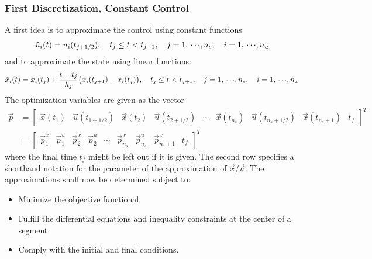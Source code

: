 			\subsubsection{First Discretization, Constant Control} %
				A first idea is to approximate the control using constant functions
				\begin{align*}
					\tilde{u}_i(t) = u_i(t_{j + 1/2}),\quad t_j \leq t < t_{j + 1},\quad j = 1,\,\cdots\!,n_s,\quad i = 1,\,\cdots\!,n_u
				\end{align*}
				and to approximate the state using linear functions:
				\begin{align*}
					\tilde{x}_i(t) = x_i(t_j) + \frac{t - t_j}{h_j} \big( x_i(t_{j + 1}) - x_i(t_j) \big),\quad t_j \leq t < t_{j + 1},\quad j = 1,\,\cdots\!,n_s,\quad i = 1,\,\cdots\!,n_x
				\end{align*}
				The optimization variables are given as the vector
				\begin{align*}
					\vec{p}
						&= \begin{bmatrix} \vec{x}(t_1) & \vec{u}(t_{1 + 1/2}) & \vec{x}(t_2) & \vec{u}(t_{2 + 1/2}) & \cdots & \vec{x}(t_{n_s}) & \vec{u}(t_{n_s + 1/2}) & \vec{x}(t_{n_s + 1}) & t_f \end{bmatrix}^T \\
						&= \begin{bmatrix} \vec{p}_1^x & \vec{p}_1^u & \vec{p}_2^x  & \vec{p}_2^u & \cdots & \vec{p}_{n_s}^x & \vec{p}_{n_s}^u & \vec{p}_{n_s + 1}^x & t_f \end{bmatrix}^T
				\end{align*}
				where the final time \(t_f\) might be left out if it is given. The second row specifies a shorthand notation for the parameter of the approximation of \(\vec{x}\)/\(\vec{u}\). The approximations shall now be determined subject to:
				\begin{itemize}
					\item Minimize the objective functional.
					\item Fulfill the differential equations and inequality constraints at the center of a segment.
					\item Comply with the initial and final conditions.
				\end{itemize}

